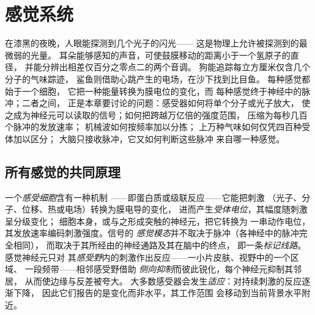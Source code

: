 \chapter{感觉系统}\label{ch:b3:sensory-systems}

在漆黑的夜晚，人眼能探测到几个光子的闪光——
这是物理上允许被探测到的最微弱的光量。
耳朵能够感知的声音，可使鼓膜移动的距离小于一个氢原子的直径，
并能分辨出相差仅百分之零点二的两个音调。
狗能追踪每立方厘米仅含几个分子的气味踪迹，
鲨鱼则借助心跳产生的电场，在沙下找到比目鱼。
每种感觉都始于一个细胞，
它把一种能量转换为膜电位的变化，而
每种感觉终于神经中的脉冲；二者之间，
正是本章要讨论的问题：感受器如何将单个分子或光子放大，
使之成为神经元可以读取的信号；如何把跨越万亿倍的强度范围，
压缩为每秒几百个脉冲的发放速率；
机械波如何按频率加以分拣；
上万种气味如何仅凭四百种受体加以区分；
大脑只接收脉冲，它又如何判断这些脉冲
来自哪一种感觉。

\section{所有感觉的共同原理}

\begin{definition}[转导、编码与适应]\label{def:b3:sensory-systems:principles}
一个\emph{感受细胞}含有一种\emph{}机制
——即蛋白质或级联反应——它能把刺激
（光子、分子、位移、热或电场）转换为膜电导的变化，
进而产生\emph{受体电位}，其幅度随刺激呈分级变化；
细胞本身，或与之形成突触的神经元，把它转换为
一串动作电位，其发放速率编码刺激强度。信号的
\emph{感觉模态}并不取决于脉冲（各神经中的脉冲完全相同），
而取决于其所经由的神经通路及其在脑中的终点，
即一条\emph{标记线路}。感觉神经元只对
其\emph{感受野}内的刺激作出反应——一小片皮肤、视野中的一个区域、
一段频带——相邻感受野借助
\emph{侧向抑制}而彼此锐化，每个神经元抑制其邻居，
从而使边缘与反差被夸大。
大多数感受器会发生\emph{适应}：对持续刺激的反应逐渐下降，
因此它们报告的是变化而非水平，其工作范围
会移动到当前背景水平附近。
\end{definition}

